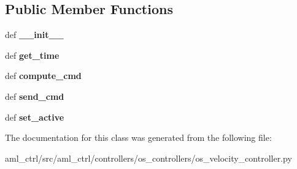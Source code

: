 \subsection*{Public Member Functions}
\begin{DoxyCompactItemize}
\item 
\hypertarget{classaml__ctrl_1_1controllers_1_1os__controllers_1_1os__velocity__controller_1_1_o_s_velocity_controller_a2fb1750695088e028a61aa6b06006b7e}{def {\bfseries \-\_\-\-\_\-init\-\_\-\-\_\-}}\label{classaml__ctrl_1_1controllers_1_1os__controllers_1_1os__velocity__controller_1_1_o_s_velocity_controller_a2fb1750695088e028a61aa6b06006b7e}

\item 
\hypertarget{classaml__ctrl_1_1controllers_1_1os__controllers_1_1os__velocity__controller_1_1_o_s_velocity_controller_a67c40896c4ff97e01876067c7f0227fc}{def {\bfseries get\-\_\-time}}\label{classaml__ctrl_1_1controllers_1_1os__controllers_1_1os__velocity__controller_1_1_o_s_velocity_controller_a67c40896c4ff97e01876067c7f0227fc}

\item 
\hypertarget{classaml__ctrl_1_1controllers_1_1os__controllers_1_1os__velocity__controller_1_1_o_s_velocity_controller_a258538858a45d152856b74c978b77b24}{def {\bfseries compute\-\_\-cmd}}\label{classaml__ctrl_1_1controllers_1_1os__controllers_1_1os__velocity__controller_1_1_o_s_velocity_controller_a258538858a45d152856b74c978b77b24}

\item 
\hypertarget{classaml__ctrl_1_1controllers_1_1os__controllers_1_1os__velocity__controller_1_1_o_s_velocity_controller_a972ac1575f218b3c77d144190d4daf13}{def {\bfseries send\-\_\-cmd}}\label{classaml__ctrl_1_1controllers_1_1os__controllers_1_1os__velocity__controller_1_1_o_s_velocity_controller_a972ac1575f218b3c77d144190d4daf13}

\item 
\hypertarget{classaml__ctrl_1_1controllers_1_1os__controllers_1_1os__velocity__controller_1_1_o_s_velocity_controller_ac09e229dbbb04fcb80f4d8b8e12cb2e8}{def {\bfseries set\-\_\-active}}\label{classaml__ctrl_1_1controllers_1_1os__controllers_1_1os__velocity__controller_1_1_o_s_velocity_controller_ac09e229dbbb04fcb80f4d8b8e12cb2e8}

\end{DoxyCompactItemize}


The documentation for this class was generated from the following file\-:\begin{DoxyCompactItemize}
\item 
aml\-\_\-ctrl/src/aml\-\_\-ctrl/controllers/os\-\_\-controllers/os\-\_\-velocity\-\_\-controller.\-py\end{DoxyCompactItemize}
